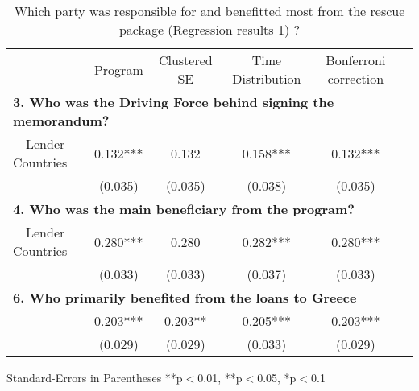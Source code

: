 \begin{table}[h!]
\caption{Which party was responsible for and benefitted most from the rescue package (Regression results 1) ?} 
\begin{tabular}{l*{5}{c}}
\hline\hline
\ \  &Program & Clustered SE & Time Distribution & Bonferroni correction \\
\multicolumn{5}{l}{\textbf{3. Who was the Driving Force behind signing the memorandum?}} \\
\ \  Lender Countries &0.132{***}&0.132{}&0.158{***} & 0.132{***} \\ 
&(0.035) & (0.035) & (0.038)& (0.035)\\ 
\multicolumn{5}{l}{\textbf{4. Who was the main beneficiary from the program? }} \\ 
\ \  Lender Countries &0.280{***}&0.280{}&0.282{***}& 0.280{***}\\ 
&(0.033) & (0.033) & (0.037) & (0.033)   \\
\hline
\multicolumn{5}{l}{\textbf{6. Who primarily benefited from the loans to Greece}} \\
\ \   &0.203{***}  &0.203{**}&0.205{***} &0.203{***}\\ 
   &(0.029) & (0.029) & (0.033) & (0.029)   \\ 
\hline\hline
\end{tabular}
\begin{tablenotes}
\small
\item Standard-Errors in Parentheses \quad  ***p$<$0.01, **p$<$0.05, *p$<$0.1   
\end{tablenotes}
\end{table}